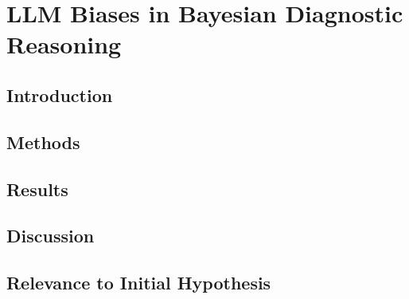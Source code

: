 \chapter{LLM Biases in Bayesian Diagnostic Reasoning} \label{chapter:race-bayes}

\section{Introduction}
\section{Methods}
\section{Results}
\section{Discussion}
\section{Relevance to Initial Hypothesis}
